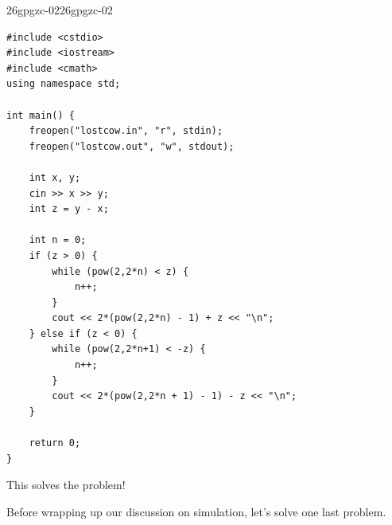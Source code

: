 \documentclass[../../../main.tex]{subfiles}
\begin{document}
\begin{solution}
\begin{cppboxSolution}{26gpgzc-02}{26gpgzc-02}
\begin{lstlisting}[style=cppstyle]
#include <cstdio>
#include <iostream>
#include <cmath>
using namespace std;

int main() {
    freopen("lostcow.in", "r", stdin);
    freopen("lostcow.out", "w", stdout);

    int x, y;
    cin >> x >> y;
    int z = y - x;

    int n = 0;
    if (z > 0) {
        while (pow(2,2*n) < z) {
            n++;
        }
        cout << 2*(pow(2,2*n) - 1) + z << "\n";
    } else if (z < 0) {
        while (pow(2,2*n+1) < -z) {
            n++;
        }
        cout << 2*(pow(2,2*n + 1) - 1) - z << "\n";
    }

    return 0;
}
\end{lstlisting}
\end{cppboxSolution}

This solves the problem!
\end{solution}

Before wrapping up our discussion on simulation, let's solve one last
problem.
\end{document}
